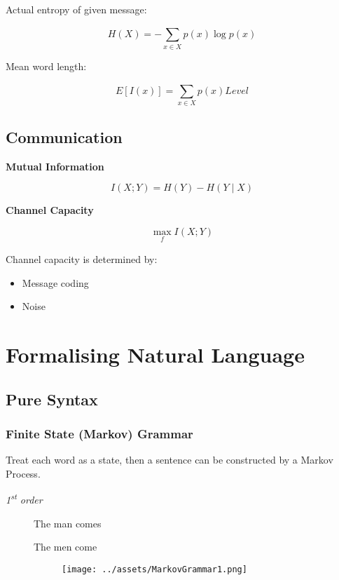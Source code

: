 \documentclass[a4paper, openany]{book}
\begin{document}
Actual entropy of given message:

\[H ( X ) = -\sum_{\mathit{x}\in X}^{} p ( \mathit{x} ) \log p ( \mathit{x} )\]

Mean word length:

\[E\left [ \mathit{I} ( \mathit{x} )  \right ] =  \sum_{\mathit{x}\in X}^{} p ( \mathit{x} ) Level\]

\subsection{Communication}

\textbf{Mutual Information}

\[\mathit{I} ( \mathit{X}; \mathit{Y} ) = \mathit{H} ( \mathit{Y} ) - \mathit{H} ( \mathit{Y} \mid \mathit{X} )\]

\textbf{Channel Capacity}

\[\max_{\mathit{f}} \mathit{I} ( \mathit{X}; \mathit{Y} )\]

Channel capacity is determined by:

\begin{itemize}
  \item Message coding
  \item Noise
\end{itemize}

\section{Formalising Natural Language}

\subsection{Pure Syntax}

\subsubsection{Finite State (Markov) Grammar}\label{FSM-Grammar}

Treat each word as a state, then a sentence can be constructed by a Markov Process.

\emph{1\textsuperscript{st} order}

\begin{figure}[htbp]
  \centering

  \parbox[t]{0.29\textwidth}{The man comes

    The men come}
  \begin{subfigure}{0.39\textwidth}
    \raggedright
    \texttt{[image: ../assets/MarkovGrammar1.png]}
  \end{subfigure}
\end{figure}
\end{document}
